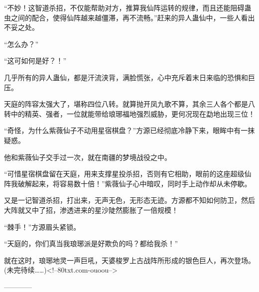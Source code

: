 \begin{this_body}
“不妙！这智道杀招，不仅能帮助对方，推算我仙阵运转的规律，而且还能阻碍蛊虫之间的配合，使得仙阵越来越僵滞，再不流畅。”赶来的异人蛊仙中，一些人看出不妥之处。

“怎么办？”

“这可如何是好？！”

几乎所有的异人蛊仙，都是汗流浃背，满脸慌张，心中充斥着末日来临的恐惧和巨压。

天庭的阵容太强大了，堪称四位八转。就算抛开凤九歌不算，其余三人各个都是八转中的精英、强者，一位就能带给琅琊福地强烈威胁，更何况现在勐地出现三位！

“奇怪，为什么紫薇仙子不动用星宿棋盘？”方源已经彻底冷静下来，眼眸中有一抹疑惑。

他和紫薇仙子交手过一次，就在南疆的梦境战役之中。

“可惜星宿棋盘留在天庭，用来支撑星投杀招，否则有它相助，眼前的这座超级仙阵我破解起来，将容易数十倍！”紫薇仙子心中暗叹，同时手上动作却从未停歇。

又是一记智道杀招，打出来，无声无色，无形态无迹。方源都不知如何防卫，然后大阵就又中了招，渗透进来的星沙陡然膨胀了一倍规模！

“棘手！”方源眉头紧锁。

“天庭的，你们真当我琅琊派是好欺负的吗？都给我杀！”

就在这时，琅琊地灵一声巨吼，天婆梭罗上古战阵所形成的银色巨人，再次登场。(未完待续……)<!--80txt.com-ouoou-->

------------

\end{this_body}

